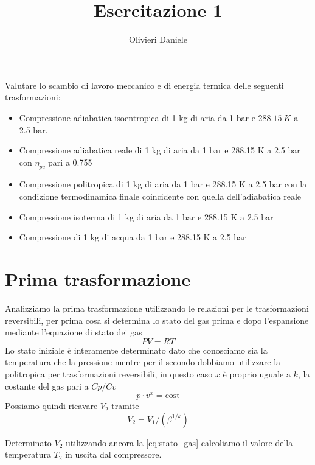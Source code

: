 \documentclass[a4paper,12pt]{article}
\title{Esercitazione 1}
\author{Olivieri Daniele}
\begin{document}
\maketitle
Valutare lo scambio di lavoro meccanico e di energia termica
delle seguenti trasformazioni:
\begin{itemize}
    \item Compressione adiabatica isoentropica di 1 kg di aria da
    1 bar e $288.15\ K$ a 2.5 bar.
    
    \item Compressione adiabatica reale di 1 kg di aria da 1 bar
    e 288.15 K a 2.5 bar con $\eta_{pc}$ pari a 0.755
   
    \item Compressione politropica di 1 kg di aria da 1 bar e 288.15 K a 2.5 bar
    con la condizione termodinamica finale coincidente con quella dell'adiabatica reale
   
    \item Compressione isoterma di 1 kg di aria da 1 bar e 288.15 K a 2.5 bar

    \item Compressione di 1 kg di acqua da 1 bar e 288.15 K a 2.5 bar
\end{itemize}

\section{Prima trasformazione}
\label{sec:prima_trasformazione}
Analizziamo la prima trasformazione utilizzando le relazioni per le trasformazioni reversibili,
per prima cosa si determina lo stato del gas prima e dopo l'espansione mediante l'equazione
di stato dei gas
\begin{equation}
    \label{eq:stato_gas}
    PV = RT
\end{equation}
Lo stato iniziale è interamente determinato dato che conosciamo sia la temperatura che la pressione
mentre per il secondo dobbiamo utilizzare la politropica per trasformazioni reversibili,
in questo caso $x$ è proprio uguale a $k$, la costante del gas pari a $Cp/Cv$
\begin{equation}
    \label{eq:politropica}
    p\cdot v^x=\text{cost}
\end{equation}
Possiamo quindi ricavare $V_2$ tramite $$  V_2 = V_1/(\beta^{1/k}) $$

Determinato $V_2$ utilizzando ancora la \eqref{eq:stato_gas} calcoliamo il valore della temperatura
$T_2$ in uscita dal compressore.
\end{document}
